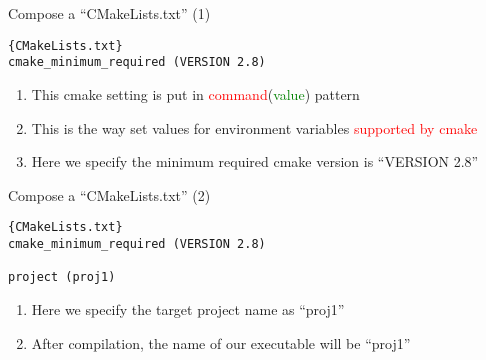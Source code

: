 \begin{frame}[fragile]{Compose a ``CMakeLists.txt'' (1)}
\begin{lstlisting}[linewidth=0.95\linewidth, firstnumber= 1, xleftmargin=0.02\linewidth]{CMakeLists.txt}
cmake_minimum_required (VERSION 2.8)
\end{lstlisting}

\begin{enumerate}
	\item {This cmake setting is put in \textcolor{red}{command}(\textcolor{green}{value}) pattern}
		\vspace{0.15in}
	\item {This is the way set values for environment variables \textcolor{red}{supported by cmake} }
		\vspace{0.15in}
	\item {Here we specify the minimum required cmake version is ``VERSION 2.8''}
\end{enumerate}
\end{frame}

\begin{frame}[fragile]{Compose a ``CMakeLists.txt'' (2)}
\begin{lstlisting}[linewidth=0.95\linewidth, firstnumber= 1, xleftmargin=0.02\linewidth]{CMakeLists.txt}
cmake_minimum_required (VERSION 2.8)

project (proj1)
\end{lstlisting}

\begin{enumerate}
	\item {Here we specify the target project name as ``proj1''}
	\vspace{0.15in}
	\item {After compilation, the name of our executable will be ``proj1''}
\end{enumerate}
\end{frame}

